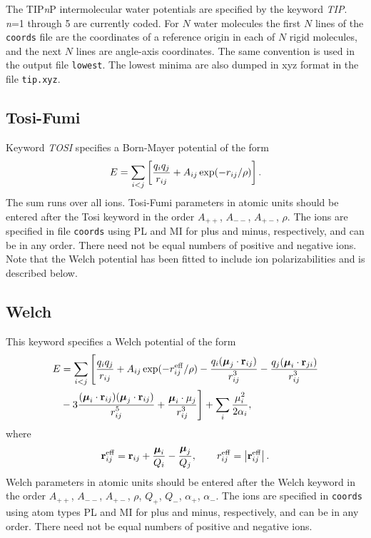 \documentclass[12pt,a4paper,dvips]{article}
\newcommand{\D}{\displaystyle}
\begin{document}
The TIP{\it n\/}P intermolecular water potentials are specified by the keyword {\it TIP\/}.
{\it n\/}=1 through 5 are currently coded. For $N$ water molecules the first $N$ lines of
the {\tt coords} file are the coordinates of a reference origin in each of $N$ rigid molecules,
and the next $N$ lines are angle-axis coordinates. The same convention is used in the output
file {\tt lowest}. The lowest minima are also dumped in xyz format in the file {\tt tip.xyz}.

\subsection{Tosi-Fumi}
 
Keyword {\it TOSI\/} specifies a Born-Mayer potential of the form
$$ E = \sum_{i<j}\left[ {q_i q_j\over r_{ij}} + A_{ij}\exp(-r_{ij}/\rho) \right]. $$
The sum runs over all ions. Tosi-Fumi\cite{tosif64} parameters in atomic units should be
entered after the Tosi keyword in the order $A_{++}$, $A_{--}$, $A_{+-}$, $\rho$.
The ions are specified in file {\tt coords} using PL and MI for plus and minus, respectively,
and can be in any order. There need not be equal numbers of positive and negative ions.
Note that the Welch potential has been fitted to include ion polarizabilities and is described below.

\subsection{Welch}This keyword specifies a Welch potential\cite{welchld76,phillipscb91} of the form
\begin{eqnarray*}
E &= \sum_{i<j}\Bigg[ {\D q_i q_j\over\D  r_{ij}} + A_{ij}\exp(-r_{ij}^{\rm eff}/\rho)
              -{\D q_i({\boldsymbol \mu}_j\cdot{\bf r}_{ij})\over\D  r_{ij}^3}
              -{\D q_j({\boldsymbol \mu}_i\cdot{\bf r}_{ji})\over\D  r_{ij}^3} \\
             &-3{\D   ({\boldsymbol \mu}_i\cdot{\bf r}_{ij})
                   ({\boldsymbol \mu}_j\cdot{\bf r}_{ij})\over\D  r_{ij}^5}
              +{\D  {\boldsymbol \mu}_i\cdot{{\bf{\mu}}}_j\over\D  r_{ij}^3}\Bigg]
              +\sum_i {\D \mu_i^2\over\D 2\alpha_i}, \\
\end{eqnarray*}
where
$$ {\bf r}_{ij}^{\rm eff}={\bf r}_{ij}+{{\boldsymbol \mu}_i\over Q_i}-{{\boldsymbol \mu}_j\over Q_j},
    \qquad r_{ij}^{\rm eff}=\left|{\bf r}_{ij}^{\rm eff}\right|. $$
Welch parameters in atomic units should be
entered after the Welch keyword in the order $A_{++}$, $A_{--}$, $A_{+-}$, $\rho$, $Q_+$,
$Q_-$, $\alpha_+$, $\alpha_-$.
The ions are specified in {\tt coords}  using atom types PL and MI for plus and minus, respectively,
and can be in any order. There need not be equal numbers of positive and negative ions.
\end{document}
